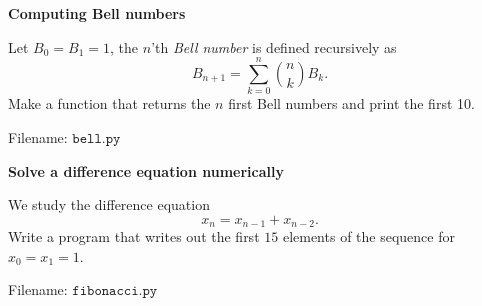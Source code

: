 
\begin{Problem}{\textbf{Computing Bell numbers}}

\noindent Let $B_0=B_1=1$, the $n$'th \emph{Bell number} is defined recursively as
\begin{equation*}
    B_{n+1}=\sum_{k=0}^n \binom{n}{k}B_k.
\end{equation*}
Make a function that returns the $n$ first Bell numbers and print the first 10.

Filename: $\texttt{bell.py}$
\end{Problem}

\begin{Problem}{\textbf{Solve a difference equation numerically}}

\noindent We study the difference equation
\begin{equation*}
x_n = x_{n-1} + x_{n-2}.
\end{equation*}
Write a program that writes out the first $15$ elements of the sequence for $x_0 = x_1 = 1$.

Filename: $\texttt{fibonacci.py}$
\end{Problem}


